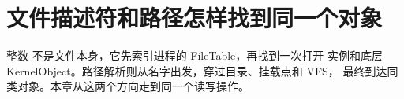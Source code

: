 \chapter{文件描述符和路径怎样找到同一个对象}

整数  不是文件本身，它先索引进程的 FileTable，再找到一次打开
实例和底层 KernelObject。路径解析则从名字出发，穿过目录、挂载点和 VFS，
最终到达同类对象。本章从这两个方向走到同一个读写操作。






